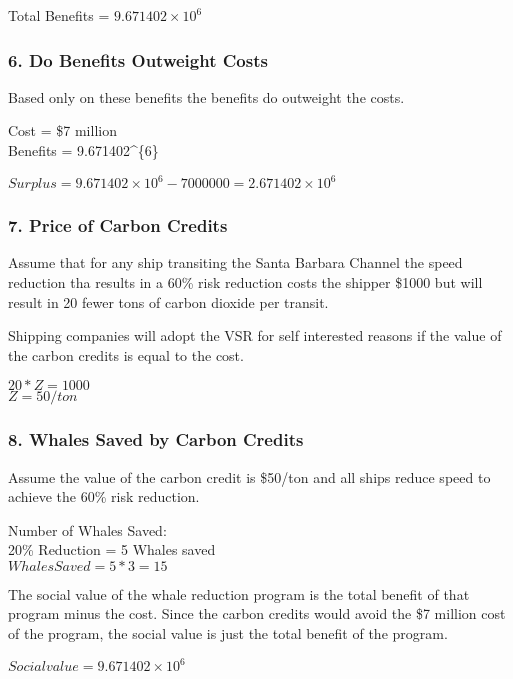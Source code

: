 \documentclass[]{article}
\begin{document}
Total Benefits = \(9.671402\times 10^{6}\)

\subsubsection{6. Do Benefits Outweight
Costs}\label{do-benefits-outweight-costs}

Based only on these benefits the benefits do outweight the costs.

Cost = \$7 million\\
Benefits = 9.671402\^{}\{6\}

\(Surplus = 9.671402\times 10^{6} - 7000000 = 2.671402\times 10^{6}\)

\subsubsection{7. Price of Carbon
Credits}\label{price-of-carbon-credits}

Assume that for any ship transiting the Santa Barbara Channel the speed
reduction tha results in a 60\% risk reduction costs the shipper \$1000
but will result in 20 fewer tons of carbon dioxide per transit.

Shipping companies will adopt the VSR for self interested reasons if the
value of the carbon credits is equal to the cost.

\(20*Z = 1000\)\\
\(Z = 50/ton\)

\subsubsection{8. Whales Saved by Carbon
Credits}\label{whales-saved-by-carbon-credits}

Assume the value of the carbon credit is \$50/ton and all ships reduce
speed to achieve the 60\% risk reduction.

Number of Whales Saved:\\
20\% Reduction = 5 Whales saved\\
\(Whales Saved = 5*3 = 15\)

The social value of the whale reduction program is the total benefit of
that program minus the cost. Since the carbon credits would avoid the
\$7 million cost of the program, the social value is just the total
benefit of the program.

\(Social value = 9.671402\times 10^{6}\)
\end{document}
